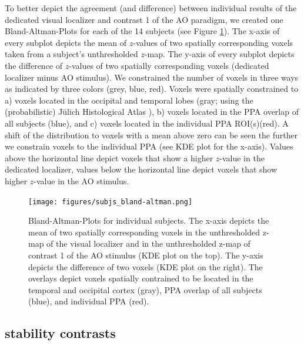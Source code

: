 \documentclass[english]{article}
\begin{document}
To better depict the agreement (and difference) between individual results of
the dedicated visual localizer and contrast 1 of the AO paradigm, we created one
Bland-Altman-Plots for each of the 14 subjects (see Figure
\ref{fig:bland-altman}).
The x-axis of every subplot depicts the mean of $z$-values of two spatially
corresponding voxels taken from a subject's unthresholded $z$-map.
The y-axis of every subplot depicts the difference of $z$-values of two
spatially corresponding voxels (dedicated localizer minus AO stimulus).
We constrained the number of voxels in three ways as indicated by three colors
(grey, blue, red).
Voxels were spatially constrained to a) voxels located in the occipital and
temporal lobes (gray; using the (probabilistic) Jülich Histological Atlas
\citep{eickhoff2005toolbox, eickhoff2007assignment}), b) voxels located in the
PPA overlap of all subjects (blue), and c) voxels located in the individual PPA
ROI(s)(red).
A shift of the distribution to voxels with a mean above zero can be seen the
further we constrain voxels to the individual PPA (see KDE plot for the x-axis).
Values above the horizontal line depict voxels that show a higher $z$-value in
the dedicated localizer, values below the horizontal line depict voxels that
show higher $z$-value in the AO stimulus.


\begin{figure} \centering
    \texttt{[image: figures/subjs\_bland-altman.png]}
    \caption{Bland-Altman-Plots for individual subjects. The x-axis depicts the
        mean of two spatially corresponding voxels in the unthresholded z-map of
        the visual localizer and in the unthresholded z-map of contrast 1 of the
        AO stimulus (KDE plot on the top). The y-axis depicts the difference of
        two voxels (KDE plot on the right). The overlays depict voxels spatially
        contrained to be located in the temporal and occipital cortex (gray),
    PPA overlap of all subjects (blue), and individual PPA (red).}
    \label{fig:bland-altman} \end{figure}


\subsection{stability contrasts}

\end{document}
